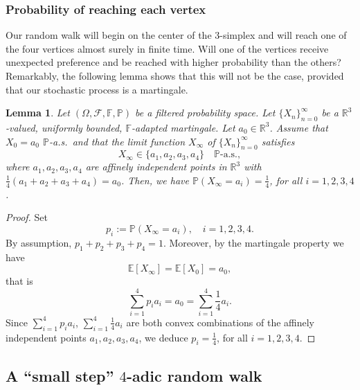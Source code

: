 \documentclass{amsart}
\newcommand{\R}{\mathbb{R}}
\newtheorem{lem}[thm]{Lemma}
\theoremstyle{definition}
\theoremstyle{remark}
\begin{document}
\subsubsection{Probability of reaching each vertex}

Our random walk will begin on the center of the $3$-simplex and will reach one of the four vertices almost surely in finite time. Will one of the vertices receive unexpected preference and be reached with higher probability than the others? Remarkably, the following lemma shows that this will not be the case, provided that our stochastic process is a martingale.

\begin{lem}
\label{lem:probability_reach_each_vertex}
Let $(\Omega,\mathcal{F},\mathbb{F},\mathbb{P})$ be a filtered probability space. Let $\{X_n\}^{\infty}_{n=0}$ be a $\mathbb{R}^3$-valued, uniformly bounded, $\mathbb{F}$-adapted martingale. Let $a_0\in\R^3$. Assume that $X_0=a_0$ $\mathbb{P}$-a.s.~and that the limit function $X_{\infty}$ of $\{X_n\}^{\infty}_{n=0}$ satisfies
\begin{equation*}
	X_{\infty}\in\{a_1,a_2,a_3,a_4\}\quad\mathbb{P}\text{-a.s.},
\end{equation*}
where $a_1,a_2,a_3,a_4$ are affinely independent points in $\R^3$ with $\frac{1}{4}(a_1+a_2+a_3+a_4)=a_0$. Then, we have $\mathbb{P}(X_{\infty}=a_i)=\frac{1}{4}$, for all $i=1,2,3,4$.
\end{lem}

\begin{proof}
Set
\begin{equation*}
	p_i:=\mathbb{P}(X_{\infty}=a_i),\quad i=1,2,3,4.
\end{equation*}
By assumption, $p_1+p_2+p_3+p_4=1$. Moreover, by the martingale property we have
\begin{equation*}
	\mathbb{E}[X_{\infty}]=\mathbb{E}[X_0]=a_0,
\end{equation*}
that is
\begin{equation*}
	\sum_{i=1}^{4}p_ia_i=a_0=\sum_{i=1}^{4}\frac{1}{4}a_i.
\end{equation*}
Since $\displaystyle\sum_{i=1}^{4}p_ia_i$, $\displaystyle\sum_{i=1}^{4}\frac{1}{4}a_i$ are both convex combinations of the affinely independent points $a_1,a_2,a_3,a_4$, we deduce $p_i=\frac{1}{4}$, for all $i=1,2,3,4$.
\bigskip
\end{proof}

\subsection{A ``small step'' \texorpdfstring{$4$}{4}-adic random walk}
\end{document}

